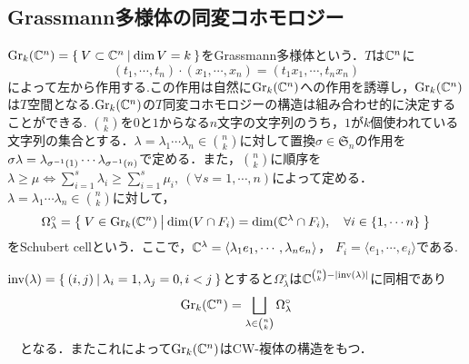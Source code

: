 \subsection{Grassmann多様体の同変コホモロジー}
$\text{Gr}_k(\mathbb{C}^n)=\left\{\:V\subset \mathbb{C}^n\:\middle|\:\dim V = k\:\right\}$をGrassmann多様体という．$T$は$\mathbb{C}^n$に
\[
(t_1,\cdots,t_n)\cdot(x_1,\cdots,x_n)=(t_1x_1,\cdots,t_nx_n)
\]
によって左から作用する.この作用は自然に$\text{Gr}_k(\mathbb{C}^n)$への作用を誘導し，$\text{Gr}_k(\mathbb{C}^n)$は$T$空間となる.$\text{Gr}_k(\mathbb{C}^n)$の$T$同変コホモロジーの構造は組み合わせ的に決定することができる.
$\binom{n}{k}$を$0$と$1$からなる$n$文字の文字列のうち，$1$が$k$個使われている文字列の集合とする．$\lambda=\lambda_1\cdots \lambda_n\in\binom{n}{k}$に対して置換$\sigma\in\mathfrak{S}_n$の作用を$\sigma\lambda=\lambda_{\sigma^{-1}(1)}\cdots\lambda_{\sigma^{-1}(n)}$で定める．また，$\binom{n}{k}$に順序を$\lambda\geq\mu\Leftrightarrow \sum_{i=1}^s\lambda_i\geq\sum_{i=1}^s\mu_i,\:(\forall s = 1,\cdots,n)$によって定める．
$\lambda=\lambda_1\cdots \lambda_n\in\binom{n}{k}$に対して，
\[
\Omega_\lambda^\circ=\left\{\:V\in \text{Gr}_k(\mathbb{C}^n)\:\middle|\:\dim(V\cap F_i)= \dim(\mathbb{C}^{\lambda}\cap F_i),\quad \forall i\in \{1,\cdots n\}\:\right\}
\]
をSchubert cellという．ここで，$\mathbb{C}^{\lambda}=\langle\lambda_{1}e_{1},\cdots,\lambda_ne_n\rangle$， $F_i=\langle e_{1},\cdots,e_i\rangle$である. 

\begin{prop}
  $\text{inv}(\lambda)=\left\{\:(i,j)\:\middle|\:\lambda_i=1, \lambda_j=0, i<j\:\right\}$とすると$\Omega_\lambda^\circ$は$\mathbb{C}^{\binom{n}{k}-|\text{inv}(\lambda)|}$に同相であり
\begin{equation}\label{CW str of grassmannian}
\text{Gr}_k(\mathbb{C}^n)=\bigsqcup_{\lambda\in\binom{n}{k}}\Omega_\lambda^\circ
\end{equation}
　となる．またこれによって$\text{Gr}_k(\mathbb{C}^n)$はCW-複体の構造をもつ．
\end{prop}

